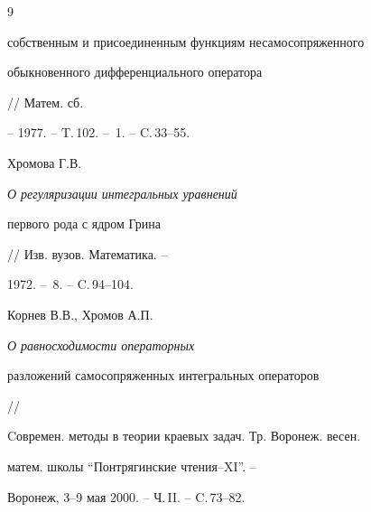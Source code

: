 \begin{thebibliography}{9}
{собственным и присоединенным функциям несамосопряженного


обыкновенного дифференциального оператора} // Матем. сб.


-- 1977. -- T.\,102. -- \No\,1. -- C.\,33--55.




Хромова Г.В. {\it О регуляризации интегральных уравнений


первого рода с ядром Грина} // Изв. вузов. Математика. --


1972. -- \No\,8. -- C.\,94--104.




Корнев В.В., Хромов А.П. {\it О равносходимости операторных


разложений самосопряженных интегральных операторов} //


Cовремен. методы в теории краевых задач. Тр. Воронеж. весен.


матем. школы ``Понтрягинские чтения--XI''. -- 


Воронеж, 3--9 мая 2000. -- Ч.\,II. -- C.\,73--82.





\end{thebibliography}





\vskip 1cm












\label{end}





